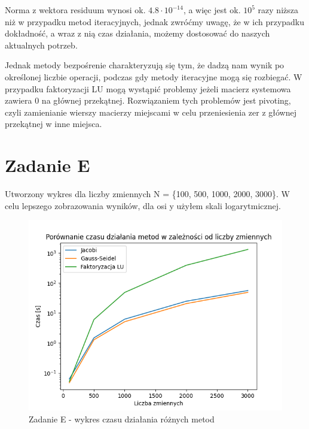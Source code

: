 \documentclass[fleqn]{article}
\begin{document}
    \noindent Norma z wektora residuum wynosi ok. $4.8 \cdot 10^{-14} $, 
    a więc jest ok. $10^5 $ razy niższa niż w przypadku metod iteracyjnych, jednak zwróćmy uwagę,
    że w ich przypadku dokładność, a wraz z nią czas działania, możemy dostosować do naszych aktualnych potrzeb. 
    
    \noindent Jednak metody bezpośrenie charakteryzują się tym, że dadzą nam wynik po określonej liczbie operacji,
    podczas gdy metody iteracyjne mogą się rozbiegać. W przypadku faktoryzacji LU mogą wystąpić problemy jeżeli macierz systemowa
    zawiera 0 na głównej przekątnej. Rozwiązaniem tych problemów jest pivoting, czyli zamienianie wierszy macierzy miejscami
    w celu przeniesienia zer z głównej przekątnej w inne miejsca.
    \newpage
    \section{Zadanie E}
    Utworzony wykres dla liczby zmiennych N = \{100, 500, 1000, 2000, 3000\}.
    W celu lepszego zobrazowania wyników, dla osi y użyłem skali logarytmicznej.


    \begin{figure}[h]

        \centering
        \includegraphics[width=\textwidth]{test.png}
        \centering
        \caption{Zadanie E - wykres czasu działania różnych metod}

    \end{figure}
    \newpage
\end{document}
